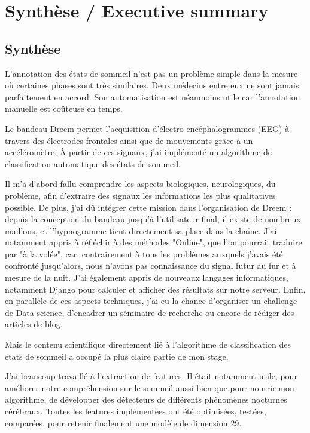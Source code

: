 \documentclass[12pt]{report}
\begin{document}
\chapter*{Synthèse / Executive summary}
\section*{Synthèse}

L'annotation des états de sommeil n'est pas un problème simple dans la mesure où certaines phases sont très similaires. Deux médecins entre eux ne sont jamais parfaitement en accord. Son automatisation est néanmoins utile car l'annotation manuelle est coûteuse en temps.

Le bandeau Dreem permet l'acquisition d'électro-encéphalogrammes (EEG) à travers des électrodes frontales ainsi que de mouvements grâce à un accéléromètre. À partir de ces signaux, j'ai implémenté un algorithme de classification automatique des états de sommeil.

Il m'a d'abord fallu comprendre les aspects biologiques, neurologiques, du problème, afin d'extraire des signaux les informations les plus qualitatives possible. De plus, j'ai dû intégrer cette mission dans l'organisation de Dreem : depuis la conception du bandeau jusqu'à l'utilisateur final, il existe de nombreux maillons, et l'hypnogramme tient directement sa place dans la chaîne. J'ai notamment appris à réfléchir à des méthodes "Online", que l'on pourrait traduire par "à la volée", car, contrairement à tous les problèmes auxquels j'avais été confronté jusqu'alors, nous n'avons pas connaissance du signal futur au fur et à mesure de la nuit. J'ai également appris de nouveaux langages informatiques, notamment Django pour calculer et afficher des résultats sur notre serveur. Enfin, en parallèle de ces aspects techniques, j'ai eu la chance d'organiser un challenge de Data science, d'encadrer un séminaire de recherche ou encore de rédiger des articles de blog.

Mais le contenu scientifique directement lié à l'algorithme de classification des états de sommeil a occupé la plus claire partie de mon stage.

J'ai beaucoup travaillé à l'extraction de features. Il était notamment utile, pour améliorer notre compréhension sur le sommeil aussi bien que pour nourrir mon algorithme, de développer des détecteurs de différents phénomènes nocturnes cérébraux. Toutes les features implémentées ont été optimisées, testées, comparées, pour retenir finalement une modèle de dimension 29.
\end{document}
